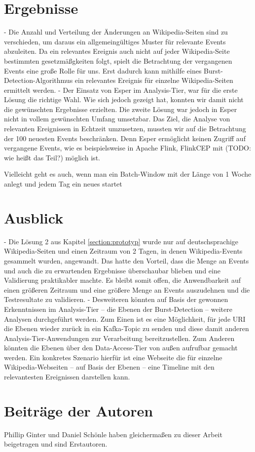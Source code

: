 \section{Ergebnisse}
- Die Anzahl und Verteilung der Änderungen an Wikipedia-Seiten sind zu verschieden, um daraus ein allgemeingültiges Muster für relevante Events abzuleiten.
Da ein relevantes Ereignis auch nicht auf jeder Wikipedia-Seite bestimmten gesetzmäßgkeiten folgt, spielt die Betrachtung der vergangenen Events eine große Rolle für uns.
Erst dadurch kann mithilfe eines Burst-Detection-Algorithmus ein relevantes Ereignis für einzelne Wikipedia-Seiten ermittelt werden.
- Der Einsatz von Esper im Analysis-Tier, war für die erste Lösung die richtige Wahl. Wie sich jedoch gezeigt hat, konnten wir damit
nicht die gewünschten Ergebnisse erzielten. Die zweite Lösung war jedoch in Esper nicht in vollem gewünschten Umfang umsetzbar.
Das Ziel, die Analyse von relevanten Ereignissen in Echtzeit umzusetzen, mussten wir auf die Betrachtung der 100 neuesten Events beschränken.
Denn Esper ermöglicht keinen Zugriff auf vergangene Events, wie es beispielsweise in Apache Flink, FlinkCEP mit (TODO: wie heißt das Teil?) möglich ist.

Vielleicht geht es auch, wenn man ein Batch-Window mit der Länge von 1 Woche anlegt und jedem Tag ein neues startet

\section{Ausblick}
- Die Lösung 2 aus Kapitel \ref{section:prototyp} wurde nur auf deutschsprachige Wikipedia-Seiten und einen Zeitraum von 2 Tagen, in denen Wikipedia-Events gesammelt wurden, angewandt.
Das hatte den Vorteil, dass die Menge an Events und auch die zu erwartenden Ergebnisse überschaubar blieben und eine Validierung praktikabler machte.
Es bleibt somit offen, die Anwendbarkeit auf einen größeren Zeitraum und eine größere Menge an Events auszudehnen und die Testresultate zu validieren.
- Desweiteren könnten auf Basis der gewonnen Erkenntnissen im Analysis-Tier -- die Ebenen der Burst-Detection -- weitere Analysen durchgeführt werden.
Zum Einen ist es eine Möglichkeit, für jede URI die Ebenen wieder zurück in ein Kafka-Topic zu senden und diese damit anderen Analysis-Tier-Anwendungen zur Verarbeitung bereitzustellen.
Zum Anderen könnten die Ebenen über den Data-Access-Tier von außen aufrufbar gemacht werden. Ein konkretes Szenario hierfür ist eine Webseite
die für einzelne Wikipedia-Webseiten -- auf Basis der Ebenen -- eine Timeline mit den relevantesten Ereignissen darstellen kann.

\section{Beiträge der Autoren}
 Phillip Ginter und Daniel Schönle haben gleichermaßen zu dieser Arbeit beigetragen und sind Erstautoren.